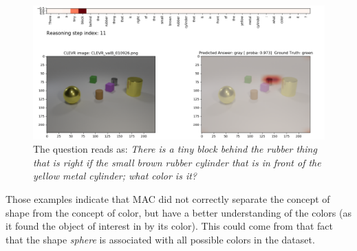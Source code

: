 \begin{figure}[htbp]
	\centering
	\includegraphics[width=\textwidth]{../img/fail_mac_cogent_b_color.png}
	\caption{The question reads as: \textit{There is a tiny block behind the rubber thing that is right if the small brown rubber cylinder that is in front of the yellow metal cylinder; what color is it?}}
	\label{fig:fail_mac_color}
\end{figure}

Those examples indicate that MAC did not correctly separate the concept of shape from the concept of color, but have a better understanding of the colors (as it found the object of interest in  by its color). This could come from that fact that the shape \textit{sphere} is associated with all possible colors in the dataset. 
